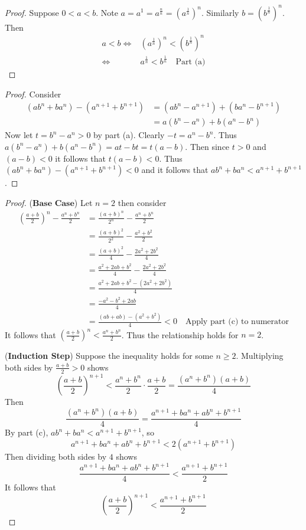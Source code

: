 \begin{proof}
    Suppose $0 < a < b$.
    Note $a = a^{1} = a^{\frac{n}{n}} = \left(a^{\frac{1}{n}}\right)^n$.
    Similarly $b = \left(b^{\frac{1}{n}}\right)^n$.
    Then 
    \begin{align*}
        a < b
        \iff &{\left(a^{\frac{1}{n}}\right)}^{n} < {\left(b^{\frac{1}{n}}\right)}^{n} \\
        \iff &a^{\frac{1}{n}} < b^{\frac{1}{n}} \quad \text{Part (a)}
    \end{align*}
\end{proof}

\begin{proof}
    Consider
    \begin{align*}
        (a b^n + b a^n) - (a^{n + 1} + b^{n + 1})
        &= (a b^n - a^{n + 1}) + (b a^n - b^{n + 1}) \\
        &= a(b^n - a^n) + b(a^n - b^n)
    \end{align*}
    Now let $t = b^n - a^n > 0$ by part (a).
    Clearly $-t = a^n - b^n$.
    Thus $a(b^n - a^n) + b(a^n - b^n) = at - bt = t(a - b)$.
    Then since $t > 0$ and $(a - b) < 0$
        it follows that $t(a - b) < 0$.
    Thus $(a b^n + b a^n) - (a^{n + 1} + b^{n + 1}) < 0$
        and it follows that $a b^n + b a^n < a^{n + 1} + b^{n + 1}$.
\end{proof}

\newpage 
\begin{proof}
    ($\textbf{Base Case}$) Let $n = 2$ then consider 
    \begin{align*}
        \left(\frac{a + b}{2}\right)^n - \frac{a^n + b^n}{2}
        &= \frac{(a + b)^n}{2^n} - \frac{a^n + b^n}{2} \\
        &= \frac{(a + b)^2}{2^2} - \frac{a^2 + b^2}{2} \\
        &= \frac{(a + b)^2}{4} - \frac{2a^2 + 2b^2}{4} \\
        &= \frac{a^2 + 2ab + b^2}{4} - \frac{2 a^2 + 2b^2}{4} \\
        &= \frac{a^2 + 2ab + b^2 - (2 a^2 + 2b^2)}{4} \\
        &= \frac{-a^2 - b^2 + 2ab}{4} \\
        &= \frac{(ab + ab) - (a^2 + b^2)}{4} < 0 \quad \text{Apply part (c) to numerator}
    \end{align*}
    It follows that $\left(\frac{a + b}{2}\right)^n < \frac{a^n + b^n}{2}$.
    Thus the relationship holds for $n = 2$.

    (\textbf{Induction Step})  
    Suppose the inequality holds for some $n \ge 2$.
    Multiplying both sides by $\frac{a+b}{2} > 0$ shows
    \[
    \left(\frac{a+b}{2}\right)^{n+1} < \frac{a^n+b^n}{2} \cdot \frac{a+b}{2} = \frac{(a^n+b^n)(a+b)}{4}
    \]
    Then
    \[
    \frac{(a^n+b^n)(a+b)}{4} = \frac{a^{n+1} + b a^n + a b^n + b^{n+1}}{4}
    \]
    By part (c), $a b^n + b a^n < a^{n+1} + b^{n+1}$, so
    \[
    a^{n+1} + b a^n + a b^n + b^{n+1} < 2(a^{n+1} + b^{n+1})
    \]
    Then dividing both sides by $4$ shows
    \[
    \frac{a^{n+1} + b a^n + a b^n + b^{n+1}}{4} < \frac{a^{n+1} + b^{n+1}}{2}
    \]
    It follows that 
    \[\left(\frac{a+b}{2}\right)^{n+1} < \frac{a^{n+1} + b^{n+1}}{2}\]
\end{proof}


